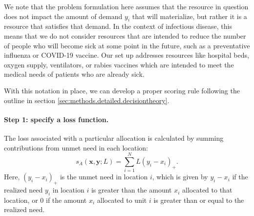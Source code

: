 \documentclass{article}
\begin{document}
We note that the problem formulation here assumes that the resource in question does not impact the amount of demand $y_i$ that will materialize, but rather it is a resource that satisfies that demand. In the context of infectious disease, this means that we do not consider resources that are intended to reduce the number of people who will become sick at some point in the future, such as a preventative influenza or COVID-19 vaccine. Our set up addresses resources like hospital beds, oxygen supply, ventilators, or rabies vaccines which are intended to meet the medical needs of patients who are already sick.

With this notation in place, we can develop a proper scoring rule following the outline in section \ref{sec:methods.detailed.decisiontheory}.

\paragraph{Step 1: specify a loss function.} The loss associated with a particular allocation is calculated by summing contributions from unmet need in each location:
\begin{equation}
s_A(\mathbf{x}, \mathbf{y}; L) = \sum_{i=1}^N L (y_i - x_i)_+. \label{eqn:loss_fn}
\end{equation}
Here, $(y_i - x_i)_+$ is the unmet need in location $i$, which is given by $y_i - x_i$ if the realized need $y_i$ in location $i$ is greater than the amount $x_i$ allocated to that location, or $0$ if the amount $x_i$ allocated to unit $i$ is greater than or equal to the realized need.
\end{document}
